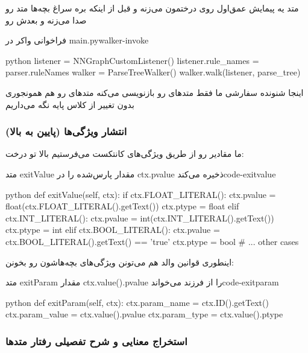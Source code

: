 \documentclass{nngraph-fa}
\begin{document}
متد  یه پیمایش عمق‌اول روی درختمون می‌زنه و قبل از اینکه بره سراغ بچه‌ها متد  رو صدا می‌زنه و بعدش  رو

\begin{dfnbox}{فراخوانی واکر در main.py}{walker-invoke}
\begin{amzcode}{python}
listener = NNGraphCustomListener()
listener.rule_names = parser.ruleNames
walker = ParseTreeWalker()
walker.walk(listener, parse_tree)
\end{amzcode}
\end{dfnbox}

اینجا شنونده سفارشی ما فقط متدهای  رو بازنویسی می‌کنه
متدهای  رو هم همونجوری بدون تغییر از کلاس پایه  نگه می‌داریم

\subsubsection{انتشار ویژگی‌ها (پایین به بالا)}

ما مقادیر رو از طریق ویژگی‌های کانتکست می‌فرستیم بالا تو درخت:

\begin{codebox}{متد exitValue مقدار پارس‌شده را در ctx.pvalue ذخیره می‌کند}{code-exitvalue}
\begin{amzcode}{python}
def exitValue(self, ctx):
    if ctx.FLOAT_LITERAL():
        ctx.pvalue = float(ctx.FLOAT_LITERAL().getText())
        ctx.ptype  = float
    elif ctx.INT_LITERAL():
        ctx.pvalue = int(ctx.INT_LITERAL().getText())
        ctx.ptype  = int
    elif ctx.BOOL_LITERAL():
        ctx.pvalue = ctx.BOOL_LITERAL().getText() == 'true'
        ctx.ptype  = bool
    # ... other cases
\end{amzcode}
\end{codebox}

اینطوری قوانین والد هم می‌تونن ویژگی‌های بچه‌هاشون رو بخونن:

\begin{codebox}{متد exitParam مقدار ctx.value().pvalue را از فرزند می‌خواند}{code-exitparam}
\begin{amzcode}{python}
def exitParam(self, ctx):
    ctx.param_name  = ctx.ID().getText()
    ctx.param_value = ctx.value().pvalue
    ctx.param_type  = ctx.value().ptype
\end{amzcode}
\end{codebox}

\subsubsection{استخراج معنایی و شرح تفصیلی رفتار متدها}
\end{document}
